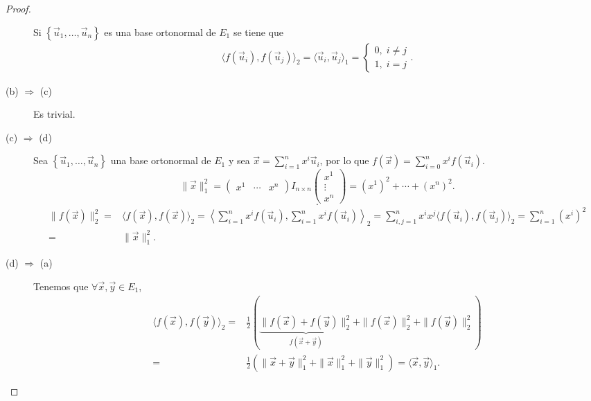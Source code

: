 \begin{proof}
\begin{description}
	Si $\displaystyle \left\{ \vec{u}_{1}, \ldots ,\vec{u}_{n}\right\}  $ es una base ortonormal de $\displaystyle E_{1} $ se tiene que 
	\[
	\begin{split}
	\langle f\left(\vec{u}_{i}\right), f\left(\vec{u}_{j}\right) \rangle_{2} = \langle\vec{u}_{i}, \vec{u}_{j}\rangle_{1} = 
	\begin{cases}
	0, \; i \neq j \\
	1, \; i = j
	\end{cases}
	.
	\end{split}
	\]
\item[(b) $\displaystyle \Rightarrow $ (c)] Es trivial. 
\item[(c) $\displaystyle \Rightarrow $ (d)] Sea $\displaystyle \left\{ \vec{u}_{1}, \ldots, \vec{u}_{n}\right\}  $ una base ortonormal de $\displaystyle E_{1} $ y sea $\displaystyle \vec{x} = \sum^{n}_{i=1}x^{i}\vec{u}_{i} $, por lo que $\displaystyle f\left(\vec{x}\right) = \sum^{n}_{i=0}x^{i}f\left(\vec{u}_{i}\right) $.
	\[ \| \vec{x}\|^{2}_{1} = \begin{pmatrix} x^{1} & \cdots & x^{n} \end{pmatrix}I_{n\times n}\begin{pmatrix} x^{1} \\ \vdots \\ x^{n} \end{pmatrix} = \left(x^{1}\right)^{2} + \cdots + \left(x^{n}\right)^{2}.\]
\[  .\]
\[
\begin{split}
	\| f\left(\vec{x}\right)\|^{2}_{2} = & \langle f\left(\vec{x}\right), f\left(\vec{x}\right)\rangle_{2} = \left\langle \sum^{n}_{i=1}x^{i}f\left(\vec{u}_{i}\right), \sum^{n}_{i=1}x^{i}f\left(\vec{u}_{i}\right)\right\rangle_{2} 
	=   \sum^{n}_{i,j=1}x^{i}x^{j}\langle f\left(\vec{u}_{i}\right), f\left(\vec{u}_{j}\right)\rangle_{2} = \sum^{n}_{i=1}\left(x^{i}\right)^{2} \\
	= &  \|\vec{x}\|^{2}_{1}.
\end{split}
\]
\item[(d) $\displaystyle \Rightarrow $ (a)] Tenemos que $\displaystyle \forall \vec{x}, \vec{y} \in E_{1} $, 
	\[
	\begin{split}
		\langle f\left(\vec{x}\right), f\left(\vec{y}\right)\rangle_{2} = & \frac{1}{2}\left(\underbrace{\|f\left(\vec{x}\right)  +f\left(\vec{y}\right)\|^{2}_{2}}_{f\left(\vec{x}+\vec{y}\right)} + \|f\left(\vec{x}\right)\|^{2}_{2}+\|f\left(\vec{y}\right)\|^{2}_{2}\right)\\
		= & \frac{1}{2}\left(\|\vec{x}+\vec{y}\|^{2}_{1}+\|\vec{x}\|^{2}_{1}+\|\vec{y}\|^{2}_{1}\right) = \langle \vec{x}, \vec{y}\rangle_{1} .
	\end{split}
	\]
\end{description}
\end{proof}
